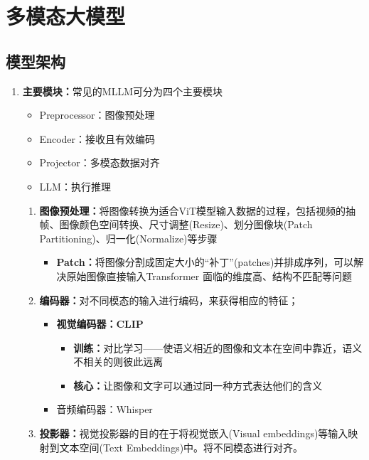 \documentclass[../main.tex]{subfiles}
\begin{document}
\section{多模态大模型}\label{sec:multimodal-llm}
\subsection{模型架构}\label{sec:mllm-architecture}
\begin{enumerate}
    \item \textbf{主要模块：}常见的MLLM可分为四个主要模块
    \begin{itemize}
        \item Preprocessor：图像预处理
        \item Encoder：接收且有效编码
        \item Projector：多模态数据对齐
        \item LLM：执行推理
    \end{itemize}
    \begin{enumerate}
        \item \textbf{图像预处理：}将图像转换为适合ViT模型输入数据的过程，包括视频的抽帧、图像颜色空间转换、尺寸调整(Resize)、划分图像块(Patch Partitioning)、归一化(Normalize)等步骤
        \begin{itemize}
            \item \textbf{Patch：}将图像分割成固定大小的“补丁”(patches)并排成序列，可以解决原始图像直接输入Transformer 面临的维度高、结构不匹配等问题
        \end{itemize}
        \item \textbf{编码器：}对不同模态的输入进行编码，来获得相应的特征；
        \begin{itemize}
            \item \textbf{视觉编码器：CLIP}
            \begin{itemize}
                \item \textbf{训练：}对比学习——使语义相近的图像和文本在空间中靠近，语义不相关的则彼此远离
                \item \textbf{核心：}让图像和文字可以通过同一种方式表达他们的含义
            \end{itemize}
            \item 音频编码器：Whisper
        \end{itemize}
        \item \textbf{投影器：}视觉投影器的目的在于将视觉嵌入(Visual embeddings)等输入映射到文本空间(Text Embeddings)中。将不同模态进行对齐。
        \begin{itemize}

\end{itemize}
\end{enumerate}
\end{enumerate}
\end{document}
